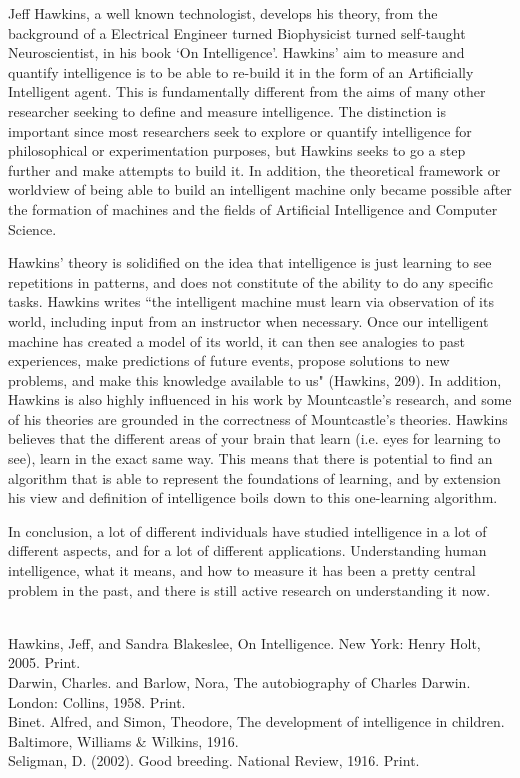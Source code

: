 \documentclass[12pt, oneside]{article}
\begin{document}
\par Jeff Hawkins, a well known technologist, develops his theory, from the background of a Electrical Engineer turned Biophysicist turned self-taught Neuroscientist, in his book `On Intelligence'. Hawkins' aim to measure and quantify intelligence is to be able to re-build it in the form of an Artificially Intelligent agent. This is fundamentally different from the aims of many other researcher seeking to define and measure intelligence. The distinction is important since most researchers seek to explore or quantify intelligence for philosophical or experimentation purposes, but Hawkins seeks to go a step further and make attempts to build it. In addition, the theoretical framework or worldview of being able to build an intelligent machine only became possible after the formation of machines and the fields of Artificial Intelligence and Computer Science.

\par Hawkins' theory is solidified on the idea that intelligence is just learning to see repetitions in patterns, and does not constitute of the ability to do any specific tasks. Hawkins writes ``the intelligent machine must learn via observation of its world, including input from an instructor when necessary. Once our intelligent machine has created a model of its world, it can then see analogies to past experiences, make predictions of future events, propose solutions to new problems, and make this knowledge available to us" (Hawkins, 209). In addition, Hawkins is also highly influenced in his work by Mountcastle's research, and some of his theories are grounded in the correctness of Mountcastle's theories. Hawkins believes that the different areas of your brain that learn (i.e. eyes for learning to see), learn in the exact same way. This means that there is potential to find an algorithm that is able to represent the foundations of learning, and by extension his view and definition of intelligence boils down to this one-learning algorithm.

\par In conclusion, a lot of different individuals have studied intelligence in a lot of different aspects, and for a lot of different applications. Understanding human intelligence, what it means, and how to measure it has been a pretty central problem in the past, and there is still active research on understanding it now.

\noindent 

\begin{workscited}
\bibent \\
\bibent Hawkins, Jeff, and Sandra Blakeslee, On Intelligence. New York: Henry Holt, 2005. Print. \\
\bibent Darwin, Charles. and Barlow, Nora, The autobiography of Charles Darwin. London: Collins, 1958. Print. \\
\bibent Binet. Alfred, and Simon, Theodore, The development of intelligence in children. Baltimore, Williams \& Wilkins, 1916. \\
\bibent Seligman, D. (2002). Good breeding. National Review, 1916.
Print. \\
\end{workscited}
\end{document}
